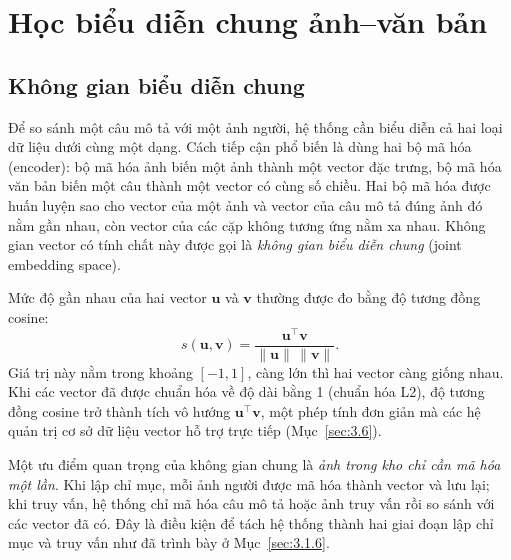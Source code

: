 \section{Học biểu diễn chung ảnh--văn bản}
\label{sec:3.5}

\subsection{Không gian biểu diễn chung}
\label{sec:3.5.1}

Để so sánh một câu mô tả với một ảnh người, hệ thống cần biểu diễn cả hai loại dữ liệu dưới cùng một dạng. Cách tiếp cận phổ biến là dùng hai bộ mã hóa (encoder): bộ mã hóa ảnh biến một ảnh thành một vector đặc trưng, bộ mã hóa văn bản biến một câu thành một vector có cùng số chiều. Hai bộ mã hóa được huấn luyện sao cho vector của một ảnh và vector của câu mô tả đúng ảnh đó nằm gần nhau, còn vector của các cặp không tương ứng nằm xa nhau. Không gian vector có tính chất này được gọi là \emph{không gian biểu diễn chung} (joint embedding space).

Mức độ gần nhau của hai vector $\mathbf{u}$ và $\mathbf{v}$ thường được đo bằng độ tương đồng cosine:
\begin{equation}
    s(\mathbf{u}, \mathbf{v}) = \frac{\mathbf{u}^\top \mathbf{v}}{\lVert \mathbf{u} \rVert \, \lVert \mathbf{v} \rVert}.
    \label{eq:cosine}
\end{equation}
Giá trị này nằm trong khoảng $[-1, 1]$, càng lớn thì hai vector càng giống nhau. Khi các vector đã được chuẩn hóa về độ dài bằng 1 (chuẩn hóa L2), độ tương đồng cosine trở thành tích vô hướng $\mathbf{u}^\top \mathbf{v}$, một phép tính đơn giản mà các hệ quản trị cơ sở dữ liệu vector hỗ trợ trực tiếp (Mục~\ref{sec:3.6}).

Một ưu điểm quan trọng của không gian chung là \emph{ảnh trong kho chỉ cần mã hóa một lần}. Khi lập chỉ mục, mỗi ảnh người được mã hóa thành vector và lưu lại; khi truy vấn, hệ thống chỉ mã hóa câu mô tả hoặc ảnh truy vấn rồi so sánh với các vector đã có. Đây là điều kiện để tách hệ thống thành hai giai đoạn lập chỉ mục và truy vấn như đã trình bày ở Mục~\ref{sec:3.1.6}.

